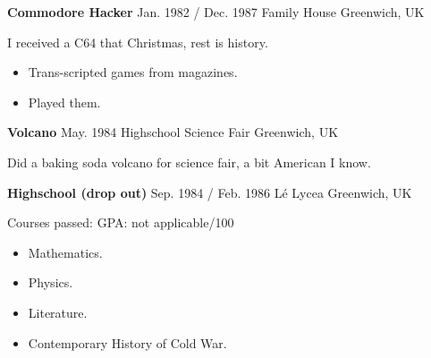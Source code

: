         \cvItemDoc
        {\large \textbf{Commodore Hacker}}
    	{Jan. 1982 / Dec. 1987}
    	{Family House}
    	{Greenwich, UK}
        {
            I received a C64 that Christmas, rest is history.
            \par
                \begin{itemize}
        	        \setlength\itemsep{0em}
        	        \item Trans-scripted games from magazines.
        	        \item Played them.
                \end{itemize}
        }
    
        \cvItemDoc
        {\large \textbf{Volcano}}
        {May. 1984}
        {Highschool Science Fair}
        {Greenwich, UK}
        {
            Did a baking soda volcano for science fair, a bit American I know.
            \par
                \begin{itemize}
        	        \setlength\itemsep{0em}
        	        
                \end{itemize}
        }
    
        \cvItemDoc
        {\large \textbf{Highschool (drop out)}}
        {Sep. 1984 / Feb. 1986}
        {L\'{e} Lycea}
        {Greenwich, UK}
        {
            Courses passed: \hfill {\small GPA: not applicable/100}
            \par
            \parbox[t]{\textwidth*\real{0.50}*\real{\rdesc}}{
                \begin{itemize}
        	        \setlength\itemsep{0em}
        	        \small
                    \item Mathematics.
                    \item Physics.
                \end{itemize}
            }   
            \parbox[t]{\textwidth*\real{0.50}*\real{\rdesc}}{
                \begin{itemize}
        	        \setlength\itemsep{0em}
        	        \small
        	        \item Literature.
                    \item Contemporary History of Cold War.
                \end{itemize}
            }
        }
    
    \null\vfill

